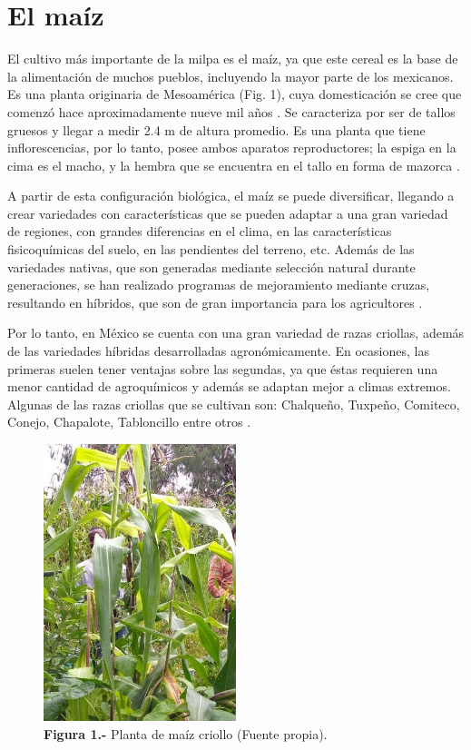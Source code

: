 \documentclass[12pt,letterpaper,oneside]{report}
\begin{document}
\section{El maíz}
El cultivo más importante de la milpa es el maíz, ya que este cereal es la base de la alimentación de muchos pueblos, incluyendo la mayor parte de los mexicanos. Es una planta originaria de Mesoamérica (Fig. 1), cuya domesticación se cree que comenzó hace aproximadamente nueve mil años \autocite{Matsuoka2002}. Se caracteriza por ser de tallos gruesos y llegar a medir 2.4 m de altura promedio. Es una planta que tiene inflorescencias, por lo tanto, posee ambos aparatos reproductores; la espiga en la cima es el macho, y la hembra que se encuentra en el tallo en forma de mazorca \autocite{Aguilar2003,Kato-Yamakake2009}.
\par
A partir de esta configuración biológica, el maíz se puede diversificar, llegando a crear variedades con características que se pueden adaptar a una gran variedad de regiones, con grandes diferencias en el clima, en las características fisicoquímicas del suelo, en las pendientes del terreno, etc. Además de las variedades nativas, que son generadas mediante selección natural durante generaciones, se han realizado programas de mejoramiento mediante cruzas, resultando en híbridos, que son de gran importancia para los agricultores \autocite{Schwember2011}.
\par
Por lo tanto, en México se cuenta con una gran variedad de razas criollas, además de las variedades híbridas desarrolladas agronómicamente. En ocasiones, las primeras suelen tener ventajas sobre las segundas, ya que éstas requieren una menor cantidad de agroquímicos y además se adaptan mejor a climas extremos. Algunas de las razas criollas que se cultivan son: Chalqueño, Tuxpeño, Comiteco, Conejo, Chapalote, Tabloncillo entre otros \autocite{Aguilar2003}.
\begin{figure}[!h]
\centering
\includegraphics[width=5.6cm]{figuras/IMG_1}
\caption*{\textbf{Figura 1.-} Planta de maíz criollo (Fuente propia).}
\label{Figura 1}
\end{figure}
\newpage
\end{document}
